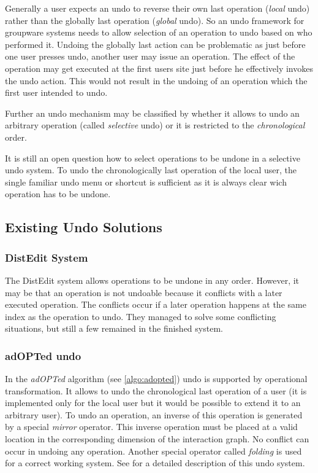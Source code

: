 Generally a user expects an undo to reverse their own last operation (\emph{local} undo) rather than the globally last operation (\emph{global} undo). So an undo framework for groupware systems needs to allow selection of an operation to undo based on who performed it. Undoing the globally last action can be problematic as just before one user presses undo, another user may issue an operation. The effect of the operation may get executed at the first users site just before he effectively invokes the undo action. This would not result in the undoing of an operation which the first user intended to undo.

Further an undo mechanism may be classified by whether it allows to undo an arbitrary operation (called \emph{selective} undo) or it is restricted to the \emph{chronological} order.

It is still an open question how to select operations to be undone in a selective undo system. To undo the chronologically last operation of the local user, the single familiar undo menu or shortcut is sufficient as it is always clear wich operation has to be undone.


\subsection{Existing Undo Solutions}

\subsubsection{DistEdit System}
The DistEdit system \cite{prakash94} allows operations to be undone in any order. However, it may be that an operation is not undoable because it conflicts with a later executed operation. The conflicts occur if a later operation happens at the same index as the operation to undo. They managed to solve some conflicting situations, but still a few remained in the finished system.


\subsubsection{adOPTed undo}
In the \emph{adOPTed} algorithm (see \ref{algo:adopted}) undo is supported by operational transformation. It allows to undo the chronological last operation of a user (it is implemented only for the local user but it would be possible to extend it to an arbitrary user). To undo an operation, an inverse of this operation is generated by a special \emph{mirror} operator. This inverse operation must be placed at a valid location in the corresponding dimension of the interaction graph. No conflict can occur in undoing any operation. Another special operator called \emph{folding} is used for a correct working system. See \cite{ressel99} for a detailed description of this undo system.

